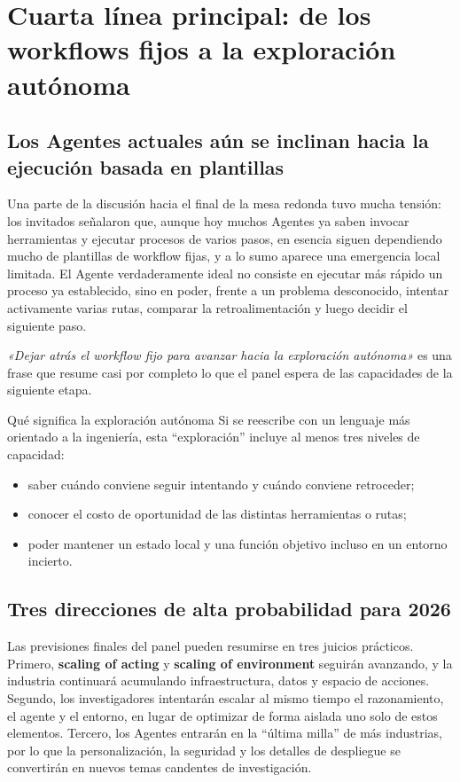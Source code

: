 \section{Cuarta línea principal: de los workflows fijos a la exploración autónoma}

\subsection{Los Agentes actuales aún se inclinan hacia la ejecución basada en plantillas}
Una parte de la discusión hacia el final de la mesa redonda tuvo mucha tensión: los invitados señalaron que, aunque hoy muchos Agentes ya saben invocar herramientas y ejecutar procesos de varios pasos, en esencia siguen dependiendo mucho de plantillas de workflow fijas, y a lo sumo aparece una emergencia local limitada. El Agente verdaderamente ideal no consiste en ejecutar más rápido un proceso ya establecido, sino en poder, frente a un problema desconocido, intentar activamente varias rutas, comparar la retroalimentación y luego decidir el siguiente paso.

\textit{«Dejar atrás el workflow fijo para avanzar hacia la exploración autónoma»} es una frase que resume casi por completo lo que el panel espera de las capacidades de la siguiente etapa.

\begin{importantbox}{Qué significa la exploración autónoma}
Si se reescribe con un lenguaje más orientado a la ingeniería, esta ``exploración'' incluye al menos tres niveles de capacidad:
\begin{itemize}
  \item saber cuándo conviene seguir intentando y cuándo conviene retroceder;
  \item conocer el costo de oportunidad de las distintas herramientas o rutas;
  \item poder mantener un estado local y una función objetivo incluso en un entorno incierto.
\end{itemize}
\end{importantbox}

\subsection{Tres direcciones de alta probabilidad para 2026}
Las previsiones finales del panel pueden resumirse en tres juicios prácticos. Primero, \textbf{scaling of acting} y \textbf{scaling of environment} seguirán avanzando, y la industria continuará acumulando infraestructura, datos y espacio de acciones. Segundo, los investigadores intentarán escalar al mismo tiempo el razonamiento, el agente y el entorno, en lugar de optimizar de forma aislada uno solo de estos elementos. Tercero, los Agentes entrarán en la ``última milla'' de más industrias, por lo que la personalización, la seguridad y los detalles de despliegue se convertirán en nuevos temas candentes de investigación.

